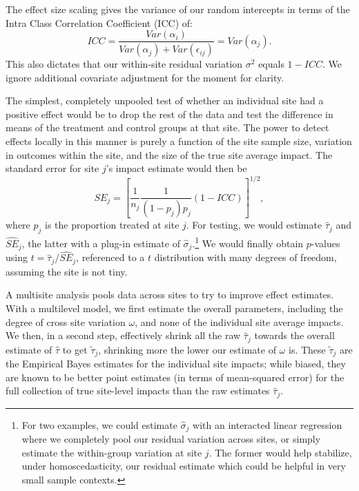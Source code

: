\documentclass[]{article}
\begin{document}
The effect size scaling gives the variance of our random intercepts in terms of the Intra Class Correlation Coefficient (ICC) of:
$$ ICC = \frac{Var(\alpha_i)}{Var(\alpha_j) + Var(\epsilon_{ij})} = Var(\alpha_j).$$
This also dictates that our within-site residual variation $\sigma^2$ equals $1-ICC$.
We ignore additional covariate adjustment for the moment for clarity.

The simplest, completely unpooled test of whether an individual site had a positive effect would be to drop the rest of the data and test the difference in means of the treatment and control groups at that site.
The power to detect effects locally in this manner is purely a function of the site sample size, variation in outcomes within the site, and the size of the true site average impact.
The standard error for site $j$'s impact estimate would then be
$$ SE_j = \left[ \frac{1}{n_j} \frac{1}{(1-p_j)p_j} (1-ICC) \right]^{1/2} , $$ 
where $p_j$ is the proportion treated at site $j$.
For testing, we would estimate $\hat{\tau}_j$ and $\widehat{SE}_j$, the latter with a plug-in estimate of $\hat{\sigma}_j$.\footnote{For two examples, we could estimate $\hat{\sigma}_j$ with an interacted linear regression where we completely pool our residual variation across sites, or simply estimate the within-group variation at site $j$.
The former would help stabilize, under homoscedasticity, our residual estimate which could be helpful in very small sample contexts.}
We would finally obtain $p$-values using $t = \hat{\tau}_j / \widehat{SE}_j$, referenced to a $t$ distribution with many degrees of freedom, assuming the site is not tiny.

A multisite analysis pools data across sites to try to improve effect estimates.
With a multilevel model, we first estimate the overall parameters, including the degree of cross site variation $\omega$, and none of the individual site average impacts.
We then, in a second step, effectively shrink all the raw $\hat{\tau}_j$ towards the overall estimate of $\hat{\tau}$ to get $\tilde{\tau}_j$, shrinking more the lower our estimate of $\omega$ is.
These $\tilde{\tau}_j$ are the Empirical Bayes estimates for the individual site impacts; while biased, they are known to be better point estimates (in terms of mean-squared error) for the full collection of true site-level impacts than the raw estimates $\hat{\tau}_j$.
\end{document}
